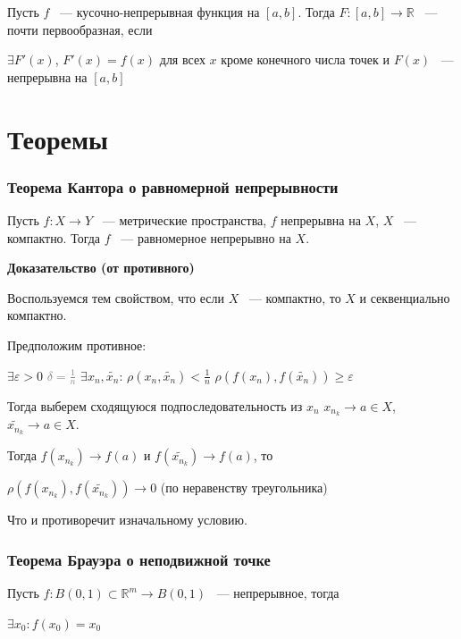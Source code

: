 \documentclass{article}
\begin{document}
		Пусть $f$ ~--- кусочно-непрерывная функция на $[a, b]$. Тогда $F : [a, b] \rightarrow \mathbb{R}$ ~--- почти первообразная, если
		
		$\exists F'(x)$, $F'(x) = f(x)$ для всех $x$ кроме конечного числа точек и $F(x)$ ~--- непрерывна на $[a, b]$
		
\newpage
	
\part{Теоремы}

	\newpage
	
	\section{Теорема Кантора о равномерной непрерывности}
	
		Пусть $f: X \rightarrow Y$ ~--- метрические пространства, $f$ непрерывна на $X$, $X$ ~--- компактно. Тогда $f$ ~--- равномерное непрерывно на $X$.
		
		\textbf{Доказательство (от противного)}
		
			Воспользуемся тем свойством, что если $X$ ~--- компактно, то $X$ и секвенциально компактно.
			
			Предположим противное:
			
			$\exists \varepsilon > 0$ \textcolor{gray}{$\delta = \frac{1}{n}$} $\exists x_n,  \widetilde{x_n}$: $\rho(x_n, \widetilde{x_n}) < \frac{1}{n}$ $\rho(f(x_n), f(\widetilde{x_n})) \geq \varepsilon$
			
			Тогда выберем сходящуюся подпоследовательность из $x_n$ $x_{n_k} \rightarrow a \in X$, $\widetilde{x_{n_k}} \rightarrow a \in X$.
			
			Тогда $f(x_{n_k}) \rightarrow f(a)$ и $f(\widetilde{x_{n_k}}) \rightarrow f(a)$, то
			
			$\rho(f(x_{n_k}), f(\widetilde{x_{n_k}})) \rightarrow 0$ (по неравенству треугольника)
			
			Что и противоречит изначальному условию.

	\newpage
	
	\section{Теорема Брауэра о неподвижной точке}
	
		Пусть $f: B(0, 1) \subset \mathbb{R}^m \rightarrow B(0, 1)$ ~--- непрерывное, тогда
		
		$\exists x_0 : f(x_0) = x_0$
		
\end{document}
